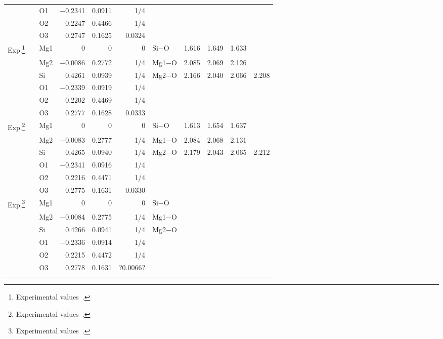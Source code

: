 \documentclass[pra,twocolumn,twocolumngrid,superbib]{revtex4} %
\begin{document}
\begin{table}[t]
\begin{tabular}{lllrrrlcccc}
    &       & O1  & $-$0.2341 & 0.0911 & 1/4    &         &       &       &       & \\%
    &       & O2  &    0.2247 & 0.4466 & 1/4    &         &       &       &       & \\%
    &       & O3  &    0.2747 & 0.1625 & 0.0324 &         &       &       &       & \\%
  \hline
    {Exp.}\footnote[5]{Experimental values~\cite{RHazen76}.}
    &       & Mg1 &    0      & 0      & 0      & Si$-$O  & 1.616 & 1.649 & 1.633 & \\%
    &       & Mg2 & $-$0.0086 & 0.2772 & 1/4    & Mg1$-$O & 2.085 & 2.069 & 2.126 & \\%
    &       & Si  &    0.4261 & 0.0939 & 1/4    & Mg2$-$O & 2.166 & 2.040 & 2.066 & 2.208 \\%
    &       & O1  & $-$0.2339 & 0.0919 & 1/4    &         &       &       &       & \\%
    &       & O2  &    0.2202 & 0.4469 & 1/4    &         &       &       &       & \\%
    &       & O3  &    0.2777 & 0.1628 & 0.0333 &         &       &       &       & \\%
    {Exp.}\footnote[6]{Experimental values~\cite{KFujino81}.}
    &       & Mg1 &    0      & 0      & 0      & Si$-$O  & 1.613 & 1.654 & 1.637 & \\%
    &       & Mg2 & $-$0.0083 & 0.2777 & 1/4    & Mg1$-$O & 2.084 & 2.068 & 2.131 & \\%
    &       & Si  &    0.4265 & 0.0940 & 1/4    & Mg2$-$O & 2.179 & 2.043 & 2.065 & 2.212 \\%
    &       & O1  & $-$0.2341 & 0.0916 & 1/4    &         &       &       &       & \\%
    &       & O2  &    0.2216 & 0.4471 & 1/4    &         &       &       &       & \\%
    &       & O3  &    0.2775 & 0.1631 & 0.0330 &         &       &       &       & \\%
    {Exp.}\footnote[7]{Experimental values~\cite{YTakeuchi84}.}
    &       & Mg1 &    0      & 0      & 0      & Si$-$O  &  &  &  & \\%
    &       & Mg2 & $-$0.0084 & 0.2775 & 1/4    & Mg1$-$O &  &  &  & \\%
    &       & Si  &    0.4266 & 0.0941 & 1/4    & Mg2$-$O &  &  &  & \\%
    &       & O1  & $-$0.2336 & 0.0914 & 1/4    &         &       &       &       & \\%
    &       & O2  &    0.2215 & 0.4472 & 1/4    &         &       &       &       & \\%
    &       & O3  &    0.2778 & 0.1631 &?0.0066?&         &       &       &       & \\%
  \botrule
  \end{tabular}
\end{table}
\end{document}
